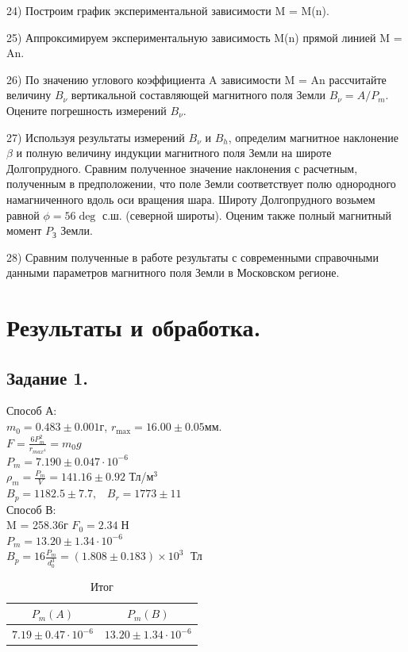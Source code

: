 \documentclass[a4paper,12pt]{article} %
\begin{document}
24) Построим график экспериментальной зависимости M = M(n).

25) Аппроксимируем экспериментальную зависимость M(n) прямой линией M = An.

26) По значению углового коэффициента A зависимости M = An рассчитайте величину $B_{\nu}$ вертикальной составляющей магнитного поля Земли $B_{\nu} = A/P_m$. Оцените погрешность измерений $B_{\nu}$.

27) Используя результаты измерений $B_{\nu}$ и $B_h$, определим магнитное наклонение $\beta$ и полную величину индукции магнитного поля Земли на широте Долгопрудного. Сравним полученное значение наклонения с расчетным, полученным в предположении, что поле Земли соответствует полю однородного намагниченного вдоль оси вращения шара. Широту Долгопрудного возьмем равной $\phi = 56\deg$ с.ш. (северной широты). Оценим также полный магнитный момент $P_\text{З}$ Земли.

28) Сравним полученные в работе результаты с современными справочными данными параметров магнитного поля Земли в Московском регионе.

\section{Результаты и обработка.}

\subsection{Задание 1.}

Способ А:\\
$m_0 = 0.483 \pm 0.001$г, $r_\text{max} = 16.00 \pm 0.05$мм.\\
$F = \frac{6P_m^2}{r_{max^4}} = m_0g$\\
$P_m = 7.190 \pm 0.047 \cdot 10^{-6}\;$\\
$\rho_m = \frac{P_m}{V} = 141.16 \pm 0.92$ Тл/м$^3$\\
$B_p = 1182.5\pm7.7,\;\;\;B_r = 1773\pm11$\\

Способ В:\\
M = 258.36г
$F_0 = 2.34\;$Н\\
$P_m = 13.20 \pm 1.34 \cdot 10^{-6}\;$\\
$B_p = 16\frac{P_m}{d_0^3} = (1.808 \pm 0.183) \times 10^{3}\;$ Тл


\begin{table}[H]
\caption{\label{tab:canonsummary} Итог}
\begin{center}
\begin{tabular}{|c|c|}
\hline
$P_m(A)$ & $P_m(B)$\\
\hline
$7.19 \pm 0.47 \cdot 10^{-6}$ & $13.20 \pm 1.34 \cdot 10^{-6}$\\
\hline
\end{tabular}
\end{center}
\label{table1:ref}
\end{table}
\end{document}
